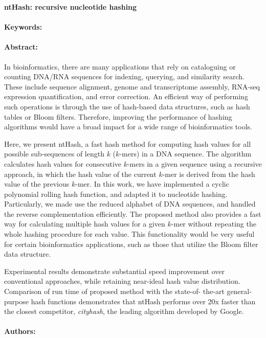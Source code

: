 \noindent
\large {\bf ntHash: recursive nucleotide hashing} 


\normalsize 


\noindent \paragraph{Keywords:} 

\noindent \paragraph{Abstract:} 

In bioinformatics, there are many applications that rely on cataloguing or counting DNA/RNA sequences
for indexing, querying, and similarity search. These include sequence alignment, genome and transcriptome
assembly, RNA-seq expression quantification, and error correction. An efficient way of performing such
operations is through the use of hash-based data structures, such as hash tables or Bloom filters. Therefore,
improving the performance of hashing algorithms would have a broad impact for a wide range of
bioinformatics tools.

Here, we present ntHash, a fast hash method for computing hash values for all possible sub-sequences of
length $k$ ($k$-mers) in a DNA sequence. The algorithm calculates hash values for consecutive $k$-mers in a
given sequence using a recursive approach, in which the hash value of the current $k$-mer is derived from the
hash value of the previous $k$-mer. In this work, we have implemented a cyclic polynomial rolling hash
function, and adapted it to nucleotide hashing. Particularly, we made use the reduced alphabet of DNA
sequences, and handled the reverse complementation efficiently. The proposed method also provides a fast
way for calculating multiple hash values for a given $k$-mer without repeating the whole hashing procedure
for each value. This functionality would be very useful for certain bioinformatics applications, such as
those that utilize the Bloom filter data structure.

Experimental results demonstrate substantial speed improvement over conventional approaches, while
retaining near-ideal hash value distribution. Comparison of run time of proposed method with the state-of-
the-art general-purpose hash functions demonstrates that ntHash performs over 20x faster than the closest
competitor, {\it cityhash}, the leading algorithm developed by Google.


\noindent \paragraph{Authors:} 

